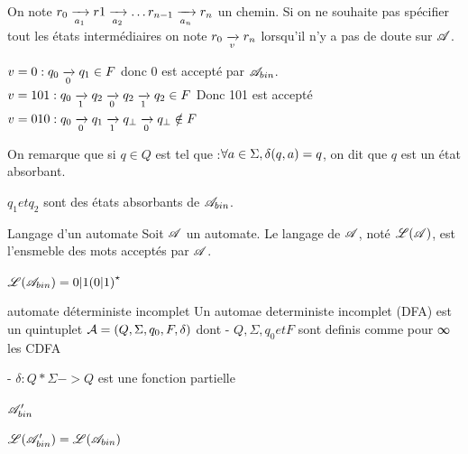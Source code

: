     \begin{notation}
        \begin{enumerate}
            \itt On note $r_0\lima{a_1} r1 \lima{a_2} \dots r_{n - 1} \lima{a_n} r_n$ un chemin.
            \itt Si on ne souhaite pas spécifier tout les états intermédiaires on note $r_0 \lima{v} r_n$ lorsqu'il n'y a pas de doute sur $\mathscr{A}$.
        \end{enumerate}
    \end{notation}
    
    \begin{example}{}{}
        \begin{enumerate}
            \itt $v = 0 : q_0 \lima{0} q_1 \in F$ donc 0 est accepté par $\mathscr{A}_{bin}$.
            \itt $v = 101 : q_0 \lima{1} q_2 \lima{0} q_2 \lima{1} q_2 \in F$ Donc 101 est accepté
            \itt $v = 010 : q_0 \lima{0} q_1 \lima{1} q_\bot \lima{0} q_\bot \notin F$
        \end{enumerate}
    \end{example}
    
    On remarque que si $q \in Q$ est tel que :$\forall a \in \Sigma, \delta \!\left(q, a\right) = q$, on dit que $q$ est un état absorbant.
    
    \begin{example}{}{}
        $q_1 et q_2$ sont des états absorbants de $\mathscr{A}_{bin}$.
    \end{example}
    
    \begin{definition}{Langage d'un automate}{}
        Soit $\mathscr{A}$ un automate. Le langage de $\mathscr{A}$, noté $\mathscr{L} \!\left(\mathscr{A}\right)$, est l'ensmeble des mots acceptés par $\mathscr{A}$.
    \end{definition}
    
    \begin{example}{}{}
        $\mathscr{L} \!\left(\mathscr{A}_{bin}\right) = 0 \vert 1 \!\left(0 \vert 1\right)^\star$
    \end{example}
    
    \begin{definition}{automate déterministe incomplet}{}
        Un automae deterministe incomplet (DFA)
        est un quintuplet $\mathcal{A} = (Q,\Sigma, q_0, F, \delta)$ dont - $Q,
        \Sigma, q_0 et F$ sont definis comme pour ∞ les CDFA 
             
             - $\delta :  Q * \Sigma -> Q $ est une fonction partielle 
    \end{definition}
    
    \begin{example}{}{}
        $\mathscr{A}_{bin}'$
        
        
        $\mathscr{L} \!\left(\mathscr{A}_{bin}'\right) = \mathscr{L} \!\left(\mathscr{A}_{bin}\right)$
    \end{example}
    
